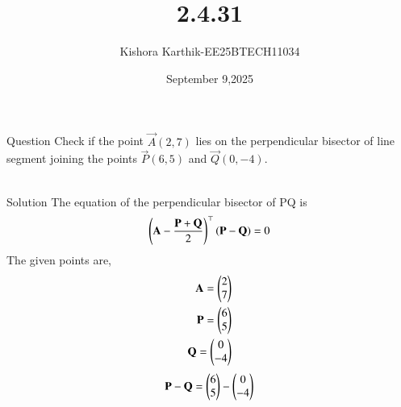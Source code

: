 \documentclass{beamer}
\begin{document}
\title 
{2.4.31}
\date{September 9,2025}


\author 
{Kishora Karthik-EE25BTECH11034}
\frame{\titlepage}
\begin{frame}{Question}
Check if the point $\vec{A}(2, 7)$ lies on the perpendicular bisector of line segment joining the points
$\vec{P}(6, 5)$ and $\vec{Q}(0, -4)$.\\\\
\end{frame}



\begin{frame}{ Solution}
The equation of the perpendicular bisector of PQ is\\
\begin{align}
    \left(\mathbf{A}-\frac{\mathbf{P}+\mathbf{Q}}{2}\right)^\top\left(\mathbf{P}-\mathbf{Q}\right)=0
\end{align}
The given points are,\\
\begin{align}
    \mathbf{A}=\begin{pmatrix}2\\7\end{pmatrix}\\
    \mathbf{P}=\begin{pmatrix}6\\5\end{pmatrix}\\
    \mathbf{Q}=\begin{pmatrix}0\\-4\end{pmatrix}
\end{align}
\begin{align}
    \mathbf{P}-\mathbf{Q}=\begin{pmatrix}6\\5\end{pmatrix}-\begin{pmatrix}0\\-4\end{pmatrix}\\
\end{align}
\end{frame}
\end{document}
